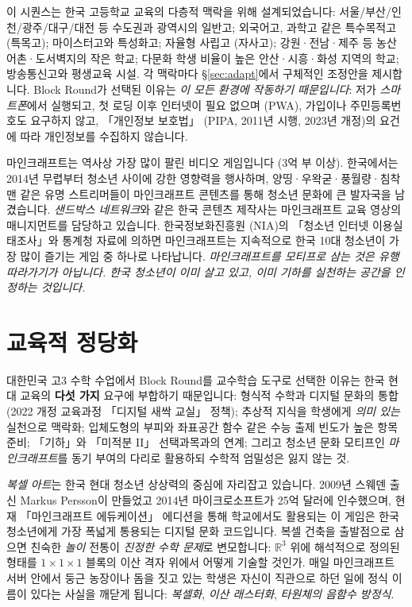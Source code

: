 \documentclass[12pt,a4paper]{scrartcl}
\newcommand{\acc}[1]{\textcolor{accent}{\textbf{#1}}}
\begin{document}
\begin{memo}
이 시퀀스는 한국 고등학교 교육의 다층적 맥락을 위해 설계되었습니다: 서울/부산/인천/광주/대구/대전 등 수도권과 광역시의 일반고; 외국어고, 과학고 같은 특수목적고 (특목고); 마이스터고와 특성화고; 자율형 사립고 (자사고); 강원·전남·제주 등 농산어촌·도서벽지의 작은 학교; 다문화 학생 비율이 높은 안산·시흥·화성 지역의 학교; 방송통신고와 평생교육 시설. 각 맥락마다 §\ref{sec:adapt}에서 구체적인 조정안을 제시합니다. Block Round가 선택된 이유는 \emph{이 모든 환경에 작동하기 때문입니다}: 저가 \emph{스마트폰}에서 실행되고, 첫 로딩 이후 인터넷이 필요 없으며 (PWA), 가입이나 주민등록번호도 요구하지 않고, 「개인정보 보호법」 (PIPA, 2011년 시행, 2023년 개정)의 요건에 따라 개인정보를 수집하지 않습니다.
\end{memo}

\begin{minecraft}
마인크래프트는 역사상 가장 많이 팔린 비디오 게임입니다 (3억 부 이상). 한국에서는 2014년 무렵부터 청소년 사이에 강한 영향력을 행사하며, 양띵·우왁굳·풍월량·침착맨 같은 유명 스트리머들이 마인크래프트 콘텐츠를 통해 청소년 문화에 큰 발자국을 남겼습니다. \emph{샌드박스 네트워크}와 같은 한국 콘텐츠 제작사는 마인크래프트 교육 영상의 매니지먼트를 담당하고 있습니다. 한국정보화진흥원 (NIA)의 「청소년 인터넷 이용실태조사」와 통계청 자료에 의하면 마인크래프트는 지속적으로 한국 10대 청소년이 가장 많이 즐기는 게임 중 하나로 나타납니다. \emph{마인크래프트를 모티프로 삼는 것은 유행 따라가기가 아닙니다. 한국 청소년이 이미 살고 있고, 이미 기하를 실천하는 공간을 인정하는 것입니다.}
\end{minecraft}

\section{교육적 정당화}\label{sec:justificativa}

대한민국 고3 수학 수업에서 Block Round를 교수학습 도구로 선택한 이유는 한국 현대 교육의 \acc{다섯 가지} 요구에 부합하기 때문입니다: 형식적 수학과 디지털 문화의 통합 (2022 개정 교육과정 「디지털 새싹 교실」 정책); 추상적 지식을 학생에게 \emph{의미 있는} 실천으로 맥락화; 입체도형의 부피와 좌표공간 함수 같은 수능 출제 빈도가 높은 항목 준비; 「기하」와 「미적분 II」 선택과목과의 연계; 그리고 청소년 문화 모티프인 \emph{마인크래프트}를 동기 부여의 다리로 활용하되 수학적 엄밀성은 잃지 않는 것.

\emph{복셀 아트}는 한국 현대 청소년 상상력의 중심에 자리잡고 있습니다. 2009년 스웨덴 출신 Markus Persson이 만들었고 2014년 마이크로소프트가 25억 달러에 인수했으며, 현재 「마인크래프트 에듀케이션」 에디션을 통해 학교에서도 활용되는 이 게임은 한국 청소년에게 가장 폭넓게 통용되는 디지털 문화 코드입니다. 복셀 건축을 출발점으로 삼으면 친숙한 \emph{놀이} 전통이 \emph{진정한 수학 문제}로 변모합니다: $\mathbb{R}^3$ 위에 해석적으로 정의된 형태를 $1\times1\times1$ 블록의 이산 격자 위에서 어떻게 기술할 것인가. 매일 마인크래프트 서버 안에서 둥근 농장이나 돔을 짓고 있는 학생은 자신이 직관으로 하던 일에 정식 이름이 있다는 사실을 깨닫게 됩니다: \emph{복셀화}, \emph{이산 래스터화}, \emph{타원체의 음함수 방정식}.
\end{document}
